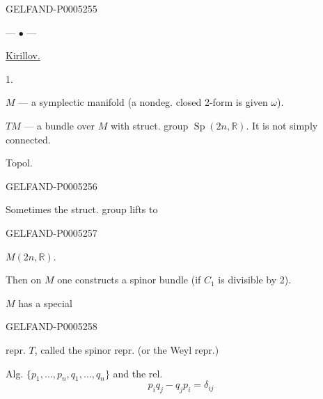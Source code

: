 \begin{GelfandAdjacentEvidence}{GELFAND-P000525}{5}

\begin{center}— $\bullet$ —\end{center}

\uline{Kirillov.}

1. 

$M$ — a symplectic manifold (a nondeg. closed 2-form is given $\omega$).

$TM$ — a bundle over $M$ with struct. group $\operatorname{Sp}(2n,\mathbb R)$. It is not simply connected.

Topol.
\end{GelfandAdjacentEvidence}
\begin{GelfandAdjacentEvidence}{GELFAND-P000525}{6}

Sometimes the struct. group lifts to
\end{GelfandAdjacentEvidence}
\begin{GelfandAdjacentEvidence}{GELFAND-P000525}{7}

$M(2n,\mathbb R)$.

Then on $M$ one constructs a spinor bundle (if $C_1$ is divisible by 2).

$M$ has a special
\end{GelfandAdjacentEvidence}
\begin{GelfandAdjacentEvidence}{GELFAND-P000525}{8}

repr. $T$, called the spinor repr. (or the Weyl repr.)

Alg. $\{p_1,\ldots,p_n,q_1,\ldots,q_n\}$ and the rel.
\[
p_iq_j-q_jp_i=\delta_{ij}
\]
\end{GelfandAdjacentEvidence}

